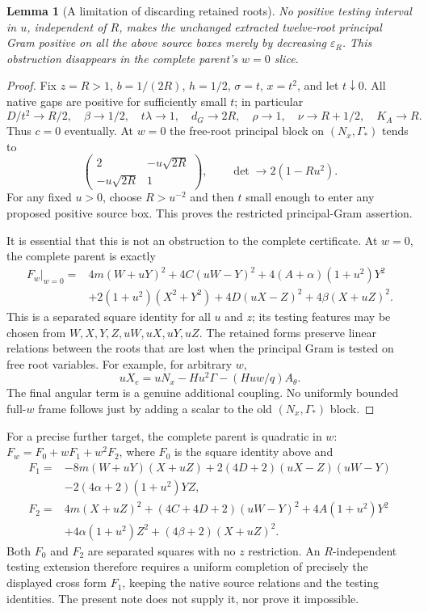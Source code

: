 \documentclass[11pt]{article}
\newtheorem{lemma}{Lemma}
\newcommand{\eps}{\varepsilon}
\newcommand{\sigs}{\sigma}
\begin{document}
\begin{lemma}[A limitation of discarding retained roots]\label{lem:retained}
No positive testing interval in $u$, independent of $R$, makes the
unchanged extracted twelve-root principal Gram positive on all the
above source boxes merely by decreasing $\eps_R$.
This obstruction disappears in the complete parent's $w=0$ slice.
\end{lemma}
\begin{proof}
Fix $z=R>1$, $b=1/(2R)$, $h=1/2$, $\sigs=t$, $x=t^2$, and let
$t\downarrow0$. All native gaps are positive for sufficiently small
$t$; in particular
\[
 D/t^2\to R/2,\quad \beta\to1/2,\quad t\lambda\to1,
 \quad d_G\to2R,\quad\rho\to1,\quad
 \nu\to R+1/2,\quad K_A\to R.
\]
Thus $c=0$ eventually. At $w=0$ the free-root principal block on
$(N_x,\Gamma_*)$ tends to
\[
 \begin{pmatrix}2&-u\sqrt{2R}\\-u\sqrt{2R}&1\end{pmatrix},
 \qquad \det\longrightarrow2(1-Ru^2).
\]
For any fixed $u>0$, choose $R>u^{-2}$ and then $t$ small enough to
enter any proposed positive source box. This proves the restricted
principal-Gram assertion.

It is essential that this is not an obstruction to the complete
certificate. At $w=0$, the complete parent is exactly
\begin{align*}
 F_w|_{w=0}={}&4m(W+uY)^2+4C(uW-Y)^2
       +4(A+\alpha)(1+u^2)Y^2\\
 &+2(1+u^2)(X^2+Y^2)
       +4D(uX-Z)^2+4\beta(X+uZ)^2 .
\end{align*}
This is a separated square identity for all $u$ and $z$; its testing
features may be chosen from $W,X,Y,Z,uW,uX,uY,uZ$.
The retained forms preserve linear relations between the roots that
are lost when the principal Gram is tested on free root variables.
For example, for arbitrary $w$,
\[
 uX_e=uN_x-Hu^2\Gamma-(Huw/q)A_\theta.
\]
The final angular term is a genuine additional coupling. No uniformly
bounded full-$w$ frame follows just by adding a scalar to the old
$(N_x,\Gamma_*)$ block.
\end{proof}

For a precise further target, the complete parent is quadratic in $w$:
$F_w=F_0+wF_1+w^2F_2$, where $F_0$ is the square identity above and
\begin{align*}
 F_1={}&-8m(W+uY)(X+uZ)
 +2(4D+2)(uX-Z)(uW-Y)\\
 &-2(4\alpha+2)(1+u^2)YZ,\\
 F_2={}&4m(X+uZ)^2+(4C+4D+2)(uW-Y)^2
 +4A(1+u^2)Y^2\\
 &+4\alpha(1+u^2)Z^2+(4\beta+2)(X+uZ)^2.
\end{align*}
Both $F_0$ and $F_2$ are separated squares with no $z$ restriction.
An $R$-independent testing extension therefore requires a uniform
completion of precisely the displayed cross form $F_1$, keeping
the native source relations and the testing identities. The present
note does not supply it, nor prove it impossible.
\end{document}
